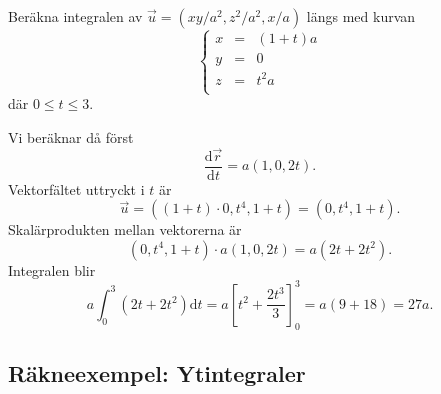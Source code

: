 \documentclass[%
oneside,                 %
final,                   %
10pt]{article}
\newenvironment{notice_mdfboxadmon}[1][]{
\begin{notice_mdfboxmdframed}[frametitle=#1]
}
{
\end{notice_mdfboxmdframed}
}
\begin{document}
\begin{notice_mdfboxadmon}

Beräkna integralen av $\vec{u} = (xy/a^2, z^2/a^2, x/a)$ längs med kurvan 
\begin{equation}
\left\{\begin{array}{lcl}
x & = & (1+t) a\\
y & = & 0\\
z & = & t^2 a\\
\end{array}\right. 
\end{equation}
där $0 \le t \le 3$.  

Vi beräknar då först 
\begin{equation}
  \frac{\mbox{d}\vec{r}}{\mbox{d}t} = a (1, 0, 2t).
\end{equation}
Vektorfältet uttryckt i $t$ är
\begin{equation}
  \vec{u} = \left(\left(1+t\right) \cdot 0, t^4, 1+t\right) = 
\left(0,t^4,1+t\right).
\end{equation}
Skalärprodukten mellan vektorerna är
\begin{equation}
  \left(0,t^4,1+t\right) \cdot a \left(1,0,2t\right) = a(2t + 2t^2).
\end{equation}
Integralen blir
\begin{equation}
  a \int_0^3 \left(2t+2t^2\right)\mbox{d}t = 
a \left[t^2 + \frac{2t^3}{3}\right]_0^3 = a(9 + 18) = 27a.
\end{equation}
\end{notice_mdfboxadmon} %



\subsection*{Räkneexempel: Ytintegraler}
\end{document}
